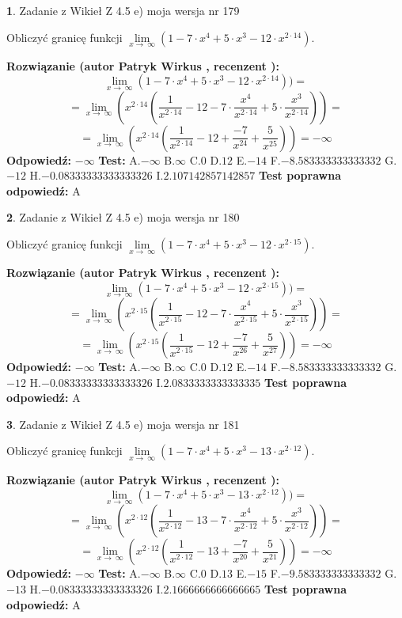 \documentclass[12pt, a4paper]{article}
\theoremstyle{definition} %
\newtheorem{zad}{}
\newcommand{\zadStart}[1]{\begin{zad}#1\newline}
\newcommand{\zadStop}{\end{zad}}
\newcommand{\rozwStart}[2]{\noindent \textbf{Rozwiązanie (autor #1 , recenzent #2): }\newline}
\newcommand{\rozwStop}{\newline}
\newcommand{\odpStart}{\noindent \textbf{Odpowiedź:}\newline}
\newcommand{\odpStop}{\newline}
\newcommand{\testStart}{\noindent \textbf{Test:}\newline}
\newcommand{\testStop}{\newline}
\newcommand{\kluczStart}{\noindent \textbf{Test poprawna odpowiedź:}\newline}
\newcommand{\kluczStop}{\newline}
\begin{document}
\zadStart{Zadanie z Wikieł Z 4.5 e) moja wersja nr 179}


Obliczyć granicę funkcji  $\lim\limits_{x\to\ \infty}(1 - 7 \cdot x^{4}+5 \cdot x^{3}- 12 \cdot x^{2\cdot14})$.
\zadStop
\rozwStart{Patryk Wirkus}{}
$$\lim\limits_{x\to\ \infty}(1 - 7 \cdot x^{4}+5 \cdot x^{3}- 12 \cdot x^{2\cdot14}))=$$
$$=\lim\limits_{x\to\ \infty}(x^{2\cdot14}(\frac{1}{x^{2\cdot14}}-12 -7 \cdot \frac{x^{4}}{x^{2\cdot14}}+5 \cdot \frac{x^{3}}{x^{2\cdot14}}))=$$
$$=\lim\limits_{x\to\ \infty}(x^{2\cdot14}(\frac{1}{x^{2\cdot14}}-12 + \frac{-7}{x^{24}}+ \frac{5}{x^{25}}))=-\infty$$
\rozwStop
\odpStart
$-\infty$
\odpStop
\testStart
A.$-\infty$ B.$\infty$ C.$0$ D.$12$ E.$-14$
F.$-8.583333333333332$ G.$-12$
H.$-0.08333333333333326$
I.$2.107142857142857$
\testStop
\kluczStart
A
\kluczStop



\zadStart{Zadanie z Wikieł Z 4.5 e) moja wersja nr 180}


Obliczyć granicę funkcji  $\lim\limits_{x\to\ \infty}(1 - 7 \cdot x^{4}+5 \cdot x^{3}- 12 \cdot x^{2\cdot15})$.
\zadStop
\rozwStart{Patryk Wirkus}{}
$$\lim\limits_{x\to\ \infty}(1 - 7 \cdot x^{4}+5 \cdot x^{3}- 12 \cdot x^{2\cdot15}))=$$
$$=\lim\limits_{x\to\ \infty}(x^{2\cdot15}(\frac{1}{x^{2\cdot15}}-12 -7 \cdot \frac{x^{4}}{x^{2\cdot15}}+5 \cdot \frac{x^{3}}{x^{2\cdot15}}))=$$
$$=\lim\limits_{x\to\ \infty}(x^{2\cdot15}(\frac{1}{x^{2\cdot15}}-12 + \frac{-7}{x^{26}}+ \frac{5}{x^{27}}))=-\infty$$
\rozwStop
\odpStart
$-\infty$
\odpStop
\testStart
A.$-\infty$ B.$\infty$ C.$0$ D.$12$ E.$-14$
F.$-8.583333333333332$ G.$-12$
H.$-0.08333333333333326$
I.$2.0833333333333335$
\testStop
\kluczStart
A
\kluczStop



\zadStart{Zadanie z Wikieł Z 4.5 e) moja wersja nr 181}


Obliczyć granicę funkcji  $\lim\limits_{x\to\ \infty}(1 - 7 \cdot x^{4}+5 \cdot x^{3}- 13 \cdot x^{2\cdot12})$.
\zadStop
\rozwStart{Patryk Wirkus}{}
$$\lim\limits_{x\to\ \infty}(1 - 7 \cdot x^{4}+5 \cdot x^{3}- 13 \cdot x^{2\cdot12}))=$$
$$=\lim\limits_{x\to\ \infty}(x^{2\cdot12}(\frac{1}{x^{2\cdot12}}-13 -7 \cdot \frac{x^{4}}{x^{2\cdot12}}+5 \cdot \frac{x^{3}}{x^{2\cdot12}}))=$$
$$=\lim\limits_{x\to\ \infty}(x^{2\cdot12}(\frac{1}{x^{2\cdot12}}-13 + \frac{-7}{x^{20}}+ \frac{5}{x^{21}}))=-\infty$$
\rozwStop
\odpStart
$-\infty$
\odpStop
\testStart
A.$-\infty$ B.$\infty$ C.$0$ D.$13$ E.$-15$
F.$-9.583333333333332$ G.$-13$
H.$-0.08333333333333326$
I.$2.1666666666666665$
\testStop
\kluczStart
A
\kluczStop
\end{document}
